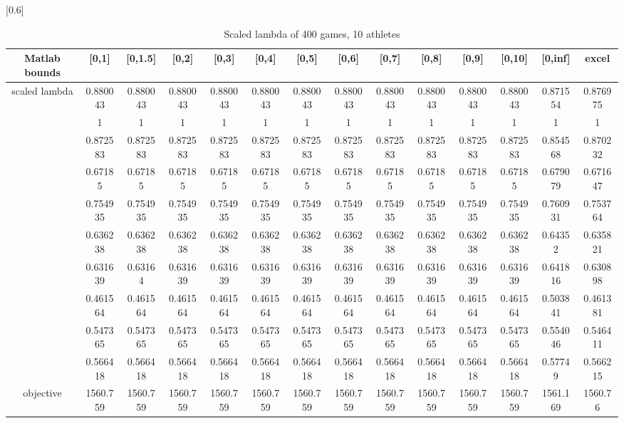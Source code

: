 \documentclass[
journal=jacsat, %
manuscript=article]{achemso}
\begin{document}
\begin{table}[htbp]
  \centering
  \caption{Scaled lambda of 400 games, 10 athletes}
   \scalebox{0.6}[0.6]{%
    \begin{tabular}{cccccccccccccc}
    \toprule
    Matlab bounds & [0,1] & [0,1.5] & [0,2] & [0,3] & [0,4] & [0,5] & [0,6] & [0,7] & [0,8] & [0,9] & [0,10] & [0,inf] & excel \\
    \hline
    \multirow{10}[0]{*}{scaled lambda } & 0.880043 & 0.880043 & 0.880043 & 0.880043 & 0.880043 & 0.880043 & 0.880043 & 0.880043 & 0.880043 & 0.880043 & 0.880043 & 0.871554 & 0.876975 \\
          & 1     & 1     & 1     & 1     & 1     & 1     & 1     & 1     & 1     & 1     & 1     & 1     & 1 \\
          & 0.872583 & 0.872583 & 0.872583 & 0.872583 & 0.872583 & 0.872583 & 0.872583 & 0.872583 & 0.872583 & 0.872583 & 0.872583 & 0.854568 & 0.870232 \\
          & 0.67185 & 0.67185 & 0.67185 & 0.67185 & 0.67185 & 0.67185 & 0.67185 & 0.67185 & 0.67185 & 0.67185 & 0.67185 & 0.679079 & 0.671647 \\
          & 0.754935 & 0.754935 & 0.754935 & 0.754935 & 0.754935 & 0.754935 & 0.754935 & 0.754935 & 0.754935 & 0.754935 & 0.754935 & 0.760931 & 0.753764 \\
          & 0.636238 & 0.636238 & 0.636238 & 0.636238 & 0.636238 & 0.636238 & 0.636238 & 0.636238 & 0.636238 & 0.636238 & 0.636238 & 0.64352 & 0.635821 \\
          & 0.631639 & 0.63164 & 0.631639 & 0.631639 & 0.631639 & 0.631639 & 0.631639 & 0.631639 & 0.631639 & 0.631639 & 0.631639 & 0.641816 & 0.630898 \\
          & 0.461564 & 0.461564 & 0.461564 & 0.461564 & 0.461564 & 0.461564 & 0.461564 & 0.461564 & 0.461564 & 0.461564 & 0.461564 & 0.503841 & 0.461381 \\
          & 0.547365 & 0.547365 & 0.547365 & 0.547365 & 0.547365 & 0.547365 & 0.547365 & 0.547365 & 0.547365 & 0.547365 & 0.547365 & 0.554046 & 0.546411 \\
          & 0.566418 & 0.566418 & 0.566418 & 0.566418 & 0.566418 & 0.566418 & 0.566418 & 0.566418 & 0.566418 & 0.566418 & 0.566418 & 0.57749 & 0.566215 \\
          \hline
    objective & 1560.759 & 1560.759 & 1560.759 & 1560.759 & 1560.759 & 1560.759 & 1560.759 & 1560.759 & 1560.759 & 1560.759 & 1560.759 & 1561.169 & 1560.76 \\
    \bottomrule
    \end{tabular}%
    }
  \label{tab:addlabel}%
\end{table}%
\end{document}
